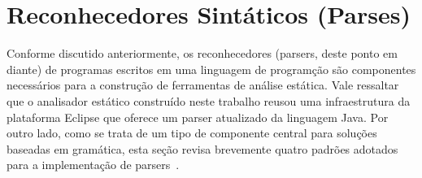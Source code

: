 

\section{Reconhecedores Sint\'{a}ticos (Parses)}

Conforme discutido anteriormente, os reconhecedores (parsers, deste ponto 
em diante) de programas escritos em uma linguagem de program\c c\~{a}o 
s\~{a}o componentes necess\'{a}rios para a constru\c c\~{a}o de ferramentas de an\'{a}lise 
est\'{a}tica. Vale ressaltar que o analisador est\'{a}tico constru\'{i}do neste trabalho reusou uma infraestrutura 
da plataforma Eclipse que oferece um parser atualizado da linguagem Java. Por outro lado, como 
se trata de um tipo de componente central para solu\c c\~{o}es baseadas em gram\'{a}tica, esta se\c c\~{a}o 
revisa brevemente quatro padr\~{o}es adotados para a implementa\c c\~{a}o de parsers~\cite{Parr:2009:LIP:1823613}.


